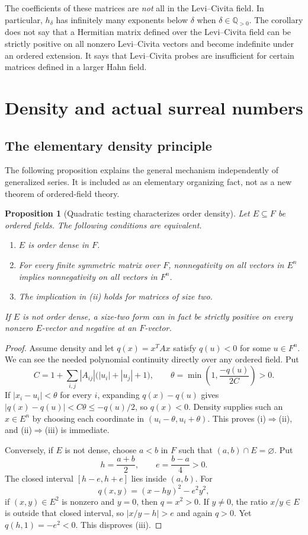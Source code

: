 \documentclass[11pt,oneside]{article}
\newtheorem{proposition}[theorem]{Proposition}
\theoremstyle{definition}
\theoremstyle{remark}
\newcommand{\Q}{\mathbb Q}
\begin{document}
The coefficients of these matrices are \emph{not} all in the
Levi--Civita field. In particular, $h_\delta$ has infinitely many
exponents below $\delta$ when $\delta\in\Q_{>0}$.
The corollary does not say that a Hermitian matrix defined over the
Levi--Civita field can be strictly positive on all nonzero Levi--Civita
vectors and become indefinite under an
ordered extension. It says that Levi--Civita probes are insufficient for
certain matrices defined in a larger Hahn field.

\section{Density and actual surreal numbers}\label{hnd:sec:density}

\subsection{The elementary density principle}

The following proposition explains the general mechanism independently
of generalized series. It is included as an elementary organizing fact,
not as a new theorem of ordered-field theory.

\begin{proposition}[Quadratic testing characterizes order density]
\label{hnd:prop:density}
Let $E\subseteq F$ be ordered fields. The following conditions are
equivalent.
\begin{enumerate}[label=(\roman*)]
\item $E$ is order dense in $F$.
\item For every finite symmetric matrix over $F$, nonnegativity on all
vectors in $E^n$ implies nonnegativity on all vectors in $F^n$.
\item The implication in (ii) holds for matrices of size two.
\end{enumerate}
If $E$ is not order dense, a size-two form can in fact be strictly
positive on every nonzero $E$-vector and negative at an $F$-vector.
\end{proposition}
\begin{proof}
Assume density and let $q(x)=x^TAx$ satisfy $q(u)<0$ for some $u\in F^n$.
We can see the needed polynomial continuity directly over any ordered
field. Put
\[
 C=1+\sum_{i,j}|A_{ij}|\bigl(|u_i|+|u_j|+1\bigr),\qquad
 \theta=\min\left(1,\frac{-q(u)}{2C}\right)>0.
\]
If $|x_i-u_i|<\theta$ for every $i$, expanding $q(x)-q(u)$ gives
$|q(x)-q(u)|<C\theta\le-q(u)/2$, so $q(x)<0$.
Density supplies such an $x\in E^n$ by choosing each coordinate in
$(u_i-\theta,u_i+\theta)$. This proves (i)$\Rightarrow$(ii), and
(ii)$\Rightarrow$(iii) is immediate.

Conversely, if $E$ is not dense, choose $a<b$ in $F$ such that
$(a,b)\cap E=\varnothing$. Put
\[
 h=\frac{a+b}{2},\qquad e=\frac{b-a}{4}>0.
\]
The closed interval $[h-e,h+e]$ lies inside $(a,b)$.
For
\[
 q(x,y)=(x-hy)^2-e^2y^2,
\]
if $(x,y)\in E^2$ is nonzero and $y=0$, then $q=x^2>0$.
If $y\ne0$, the ratio $x/y\in E$ is outside that closed interval,
so $|x/y-h|>e$ and again $q>0$. Yet $q(h,1)=-e^2<0$.
This disproves (iii).
\end{proof}
\end{document}
